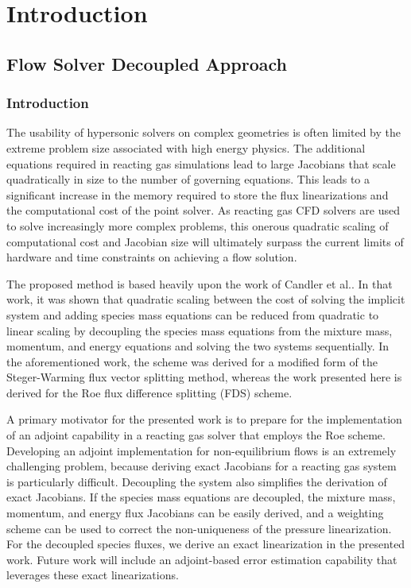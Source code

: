 \chapter{Introduction}
\label{chap-one}

\section{Flow Solver Decoupled Approach}
\subsection{Introduction}

The usability of hypersonic solvers on complex geometries is often limited by
the extreme problem size associated with high energy physics.  The additional
equations required in reacting gas simulations lead to large Jacobians that
scale quadratically in size to the number of governing equations.  This leads
to a significant increase in the memory required to store the flux
linearizations and the computational cost of the point solver.  As reacting gas
CFD solvers are used to solve increasingly more complex problems, this onerous
quadratic scaling of computational cost and Jacobian size will ultimately
surpass the current limits of hardware and time constraints on achieving a flow
solution\cite{fischer}.

The proposed method is based heavily upon the work of Candler et
al.\cite{candler}. In that work, it was shown that quadratic scaling between the
cost of solving the implicit system and adding species mass equations can be
reduced from quadratic to linear scaling by decoupling the species mass
equations from the mixture mass, momentum, and energy equations and solving the
two systems sequentially.  In the aforementioned work, the scheme was derived
for a modified form of the Steger-Warming flux vector splitting
method\cite{MacCormack}, whereas the work presented here is derived for the Roe
flux difference splitting (FDS) scheme\cite{roe}.

A primary motivator for the presented work is to prepare for the implementation
of an adjoint capability in a reacting gas solver that employs the Roe scheme.
Developing an adjoint implementation for non-equilibrium flows is an extremely
challenging problem, because deriving exact Jacobians for a reacting gas system
is particularly difficult.  Decoupling the system also simplifies the derivation
of exact Jacobians.  If the species mass equations are decoupled, the mixture mass,
momentum, and energy flux Jacobians can be easily derived\cite{Nishikawa}, and a
weighting scheme can be used to correct the non-uniqueness of the pressure
linearization\cite{Shuen}.  For the decoupled species fluxes, we derive an exact
linearization in the presented work.  Future work will include an adjoint-based
error estimation capability that leverages these exact linearizations.

